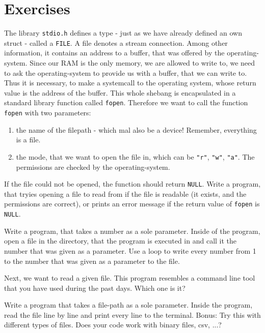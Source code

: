 \documentclass{dcbl/challenge}
\begin{document}
\section*{Exercises}
\begin{aufgabe}
    The library \texttt{stdio.h} defines a type - just as we have already defined an own struct - called a \texttt{FILE}.
    A file denotes a stream connection. 
    Among other information, it contains an address to a buffer, that was offered by the operating-system. 
    Since our RAM is the only memory, we are allowed to write to, we need to ask the operating-system to provide us with a buffer, that we can write to.
    Thus it is necessary, to make a systemcall to the operating system, whose return value is the address of the buffer.
    This whole shebang is encapsulated in a standard library function called \texttt{fopen}.
    Therefore we want to call the function \texttt{fopen} with two parameters:
    \begin{enumerate}
        \item the name of the filepath - which mal also be a device! Remember, everything is a file.
        \item the mode, that we want to open the file in, which can be \texttt{"r"}, \texttt{"w"}, \texttt{"a"}. The permissions are checked by the operating-system.
    \end{enumerate}
    If the file could not be opened, the function should return \texttt{NULL}.
    Write a program, that tryies opening a file to read from if the file is readable (it exists, and the permissions are correct), or prints an error message if the return value of \texttt{fopen} is \texttt{NULL}.
\end{aufgabe}
\begin{aufgabe}
    Write a program, that takes a number as a sole parameter.
    Inside of the program, open a file in the directory, that the program is executed in and call it the number that was given as a parameter.
    Use a loop to write every number from 1 to the number that was given as a parameter to the file.
\end{aufgabe}

\begin{aufgabe}
    Next, we want to read a given file. This program resembles a command line tool that you have used during the past days. Which one is it?
    
    Write a program that takes a file-path as a sole parameter.
    Inside the program, read the file line by line and print every line to the terminal.
    Bonus: Try this with different types of files. Does your code work with binary files, csv, ...?
\end{aufgabe}
\end{document}
